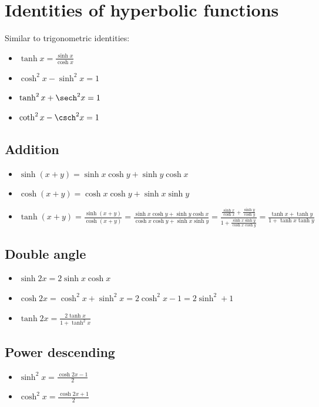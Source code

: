 \section{Identities of hyperbolic functions}
Similar to trigonometric identities:
\begin{itemize}
    \item $\tanh x = \frac{\sinh x}{\cosh x}$
    \item $\cosh^2 x - \sinh^2 x = 1$
    \item $\tanh^2 x + \sech^2 x= 1$
    \item $\coth^2 x - \csch^2 x = 1$
\end{itemize}

\subsection{Addition}
\begin{itemize}
    \item $\sinh(x+y)=\sinh x \cosh y + \sinh y \cosh x$
    \item $\cosh(x+y)=\cosh x \cosh y + \sinh x \sinh y$
    \item $\tanh(x+y) = \frac{\sinh(x+y)}{\cosh(x+y)} = \frac{\sinh x \cosh y + \sinh y \cosh x}{\cosh x \cosh y + \sinh x \sinh y} = \frac{\frac{\sinh x}{\cosh x}+\frac{\sinh y}{\cosh y}}{1 + \frac{\sinh x \sinh y}{\cosh x \cosh y}}=\frac{\tanh x + \tanh y}{1 + \tanh x \tanh y}$
\end{itemize}

\subsection{Double angle}
\begin{itemize}
    \item $\sinh 2x = 2\sinh x \cosh x$
    \item $\cosh 2x = \cosh^2 x + \sinh^2 x = 2\cosh^2 x - 1 = 2\sinh^2 + 1$
    \item $\tanh 2x = \frac{2\tanh x}{1 + \tanh^2 x}$
\end{itemize}

\subsection{Power descending}
\begin{itemize}
    \item $\sinh^2 x = \frac{\cosh 2x - 1}{2}$
    \item $\cosh^2 x = \frac{\cosh 2x + 1}{2}$
\end{itemize}


